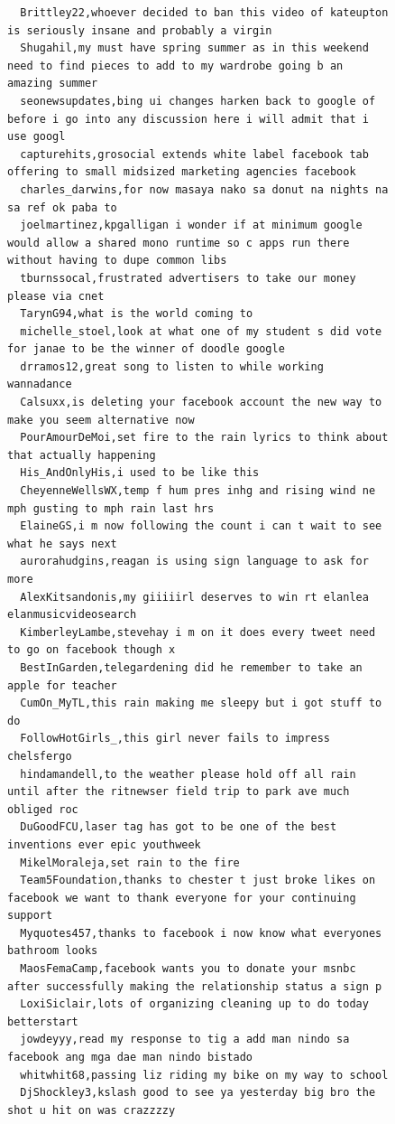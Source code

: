 \begin{figure}[htpb]
\begin{verbatim}
  Brittley22,whoever decided to ban this video of kateupton is seriously insane and probably a virgin
  Shugahil,my must have spring summer as in this weekend need to find pieces to add to my wardrobe going b an amazing summer
  seonewsupdates,bing ui changes harken back to google of before i go into any discussion here i will admit that i use googl
  capturehits,grosocial extends white label facebook tab offering to small midsized marketing agencies facebook
  charles_darwins,for now masaya nako sa donut na nights na sa ref ok paba to
  joelmartinez,kpgalligan i wonder if at minimum google would allow a shared mono runtime so c apps run there without having to dupe common libs
  tburnssocal,frustrated advertisers to take our money please via cnet
  TarynG94,what is the world coming to
  michelle_stoel,look at what one of my student s did vote for janae to be the winner of doodle google
  drramos12,great song to listen to while working wannadance
  Calsuxx,is deleting your facebook account the new way to make you seem alternative now
  PourAmourDeMoi,set fire to the rain lyrics to think about that actually happening
  His_AndOnlyHis,i used to be like this
  CheyenneWellsWX,temp f hum pres inhg and rising wind ne mph gusting to mph rain last hrs
  ElaineGS,i m now following the count i can t wait to see what he says next
  aurorahudgins,reagan is using sign language to ask for more
  AlexKitsandonis,my giiiiirl deserves to win rt elanlea elanmusicvideosearch
  KimberleyLambe,stevehay i m on it does every tweet need to go on facebook though x
  BestInGarden,telegardening did he remember to take an apple for teacher
  CumOn_MyTL,this rain making me sleepy but i got stuff to do
  FollowHotGirls_,this girl never fails to impress chelsfergo
  hindamandell,to the weather please hold off all rain until after the ritnewser field trip to park ave much obliged roc
  DuGoodFCU,laser tag has got to be one of the best inventions ever epic youthweek
  MikelMoraleja,set rain to the fire
  Team5Foundation,thanks to chester t just broke likes on facebook we want to thank everyone for your continuing support
  Myquotes457,thanks to facebook i now know what everyones bathroom looks
  MaosFemaCamp,facebook wants you to donate your msnbc after successfully making the relationship status a sign p
  LoxiSiclair,lots of organizing cleaning up to do today betterstart
  jowdeyyy,read my response to tig a add man nindo sa facebook ang mga dae man nindo bistado
  whitwhit68,passing liz riding my bike on my way to school
  DjShockley3,kslash good to see ya yesterday big bro the shot u hit on was crazzzzy

\end{verbatim}
\end{figure}
